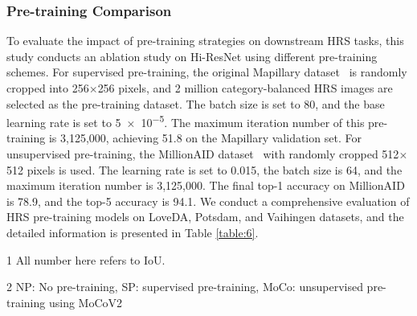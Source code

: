 \documentclass[journal]{IEEEtran}
\begin{document}
\subsubsection{Pre-training Comparison}
To evaluate the impact of pre-training strategies on downstream HRS tasks, this study conducts an ablation study on Hi-ResNet using different pre-training schemes. For supervised pre-training, the original Mapillary dataset~\cite{neuhold2017mapillary} is randomly cropped into 256$\times$256 pixels, and 2 million category-balanced HRS images are selected as the pre-training dataset. The batch size is set to 80, and the base learning rate is set to \num{5e-5}. The maximum iteration number of this pre-training is 3,125,000, achieving 51.8 on the Mapillary validation set. For unsupervised pre-training, the MillionAID dataset~\cite{long2021creating} with randomly cropped 512$\times$512 pixels is used. The learning rate is set to 0.015, the batch size is 64, and the maximum iteration number is 3,125,000. The final top-1 accuracy on MillionAID is 78.9, and the top-5 accuracy is 94.1. We conduct a comprehensive evaluation of HRS pre-training models on LoveDA, Potsdam, and Vaihingen datasets, and the detailed information is presented in Table \ref{table:6}.


\begin{table}[!ht]
  \begin{center}
  \begin{threeparttable}
    \begin{tablenotes}
        \footnotesize  
        \item[1] All number here refers to IoU. 
        \item[2] NP: No pre-training, SP: supervised pre-training, MoCo: unsupervised pre-training using MoCoV2
        
      \end{tablenotes} 
    \end{threeparttable}
  \end{center}
  \label{table:6}
\end{table}
\end{document}
